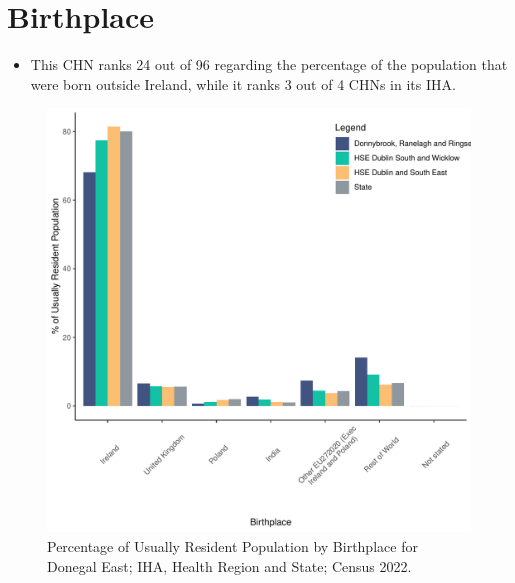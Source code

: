 \documentclass{article}
\begin{document}
\section{Birthplace}\label{sect:Birth}
\begin{itemize}
\item This CHN ranks  24 out of 96 regarding the percentage of the population that were born outside Ireland, while it ranks  3 out of 4 CHNs in its IHA.
\end{itemize}
\begin{figure}[H]
	\centering
	\includegraphics[width = 130mm]{../figures/BirthED.pdf}
	\caption{Percentage of Usually Resident Population by Birthplace for Donegal East; IHA, Health Region and State; Census 2022.}
	\label{fig:vbnv}
	\end{figure}
	
\end{document}
